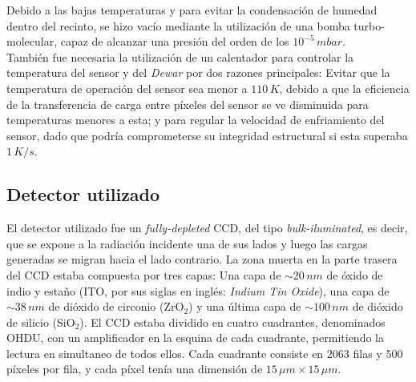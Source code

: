 Debido a las bajas temperaturas y para evitar la condensación de humedad dentro del recinto, se hizo vacío mediante la utilización de una bomba turbo-molecular, capaz de alcanzar una presión del orden de los $10^{-5}\,\si{mbar}$.\\
\indent También fue necesaria la utilización de un calentador para controlar la temperatura del sensor y del \textit{Dewar} por dos razones principales: Evitar que la temperatura de operación del sensor sea menor a $110\,\si{K}$, debido a que la eficiencia de la transferencia de carga entre píxeles del sensor se ve disminuida para temperaturas menores a esta; y para regular la velocidad de enfriamiento del sensor, dado que podría comprometerse su integridad estructural si esta superaba $1\,\si{K/s}$.\\
\subsection{Detector utilizado}
\noindent El detector utilizado fue un \textit{fully-depleted} CCD, del tipo \textit{bulk-iluminated}, es decir, que se expone a la radiación incidente una de sus lados y luego las cargas generadas se migran hacia el lado contrario. La zona muerta en la parte trasera del CCD estaba compuesta por tres capas: Una capa de $\sim 20\,\si{nm}$ de óxido de indio y estaño (ITO, por sus siglas en inglés: \textit{Indium Tin Oxide}), una capa de $\sim 38\,\si{nm}$ de dióxido de circonio (ZrO$_{2}$) y una última capa de $\sim 100\,\si{nm}$ de dióxido de silicio (SiO$_{2}$). El CCD estaba dividido en cuatro cuadrantes, denominados OHDU, con un amplificador en la esquina de cada cuadrante, permitiendo la lectura en simultaneo de todos ellos. Cada cuadrante consiste en $2063$ filas y $500$ píxeles por fila, y cada píxel tenía una dimensión de $15\,\si{\mu m} \times 15\,\si{\mu m}$.
